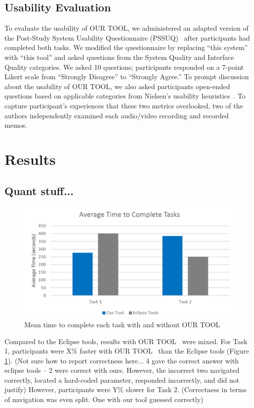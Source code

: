 \documentclass[conference]{IEEEtran}
\newcommand{\toolName}{OUR TOOL}
\begin{document}
\subsection{Usability Evaluation}
\label{UsabilityMethodology}
To evaluate the usability of \toolName, we administered an adapted version of the Post-Study System Usability Questionnaire (PSSUQ)~\cite{Lewis95ibmcomputer} after participants had completed both tasks. We modified the questionnaire by replacing ``this system'' with ``this tool'' and asked questions from the System Quality and Interface Quality categories. We asked 10 questions; participants responded on a 7-point Likert scale from ``Strongly Disagree'' to ``Strongly Agree.'' 	
To prompt discussion about the usability of \toolName, we also asked participants open-ended questions based on applicable categories from Nielsen's usability heuristics~\cite{Nielsen1992}.
To capture participant's experiences that these two metrics overlooked, two of the authors independently examined each audio/video recording and recorded memos. 

\section{Results}
\subsection{Quant stuff...}
\begin{figure}
	\centering
	\includegraphics[width=\columnwidth]{images/taskTime}
	\caption{Mean time to complete each task with and without \toolName}
	\label{fig:taskTime} 
\end{figure}


Compared to the Eclipse tools, results with \toolName~ were mixed.
For Task 1, participants were X\% faster with \toolName~ than the Eclipse tools (Figure \ref{fig:taskTime}). 
(Not sure how to report correctness here... 4 gave the correct answer with eclipse tools --
2 were correct with ours. However, the incorrect two navigated correctly, located a hard-coded parameter, responded incorrectly, and did not justify)
However, participants were Y\% slower for Task 2.
(Correctness in terms of navigation was even split. One with our tool guessed correctly)
\end{document}
